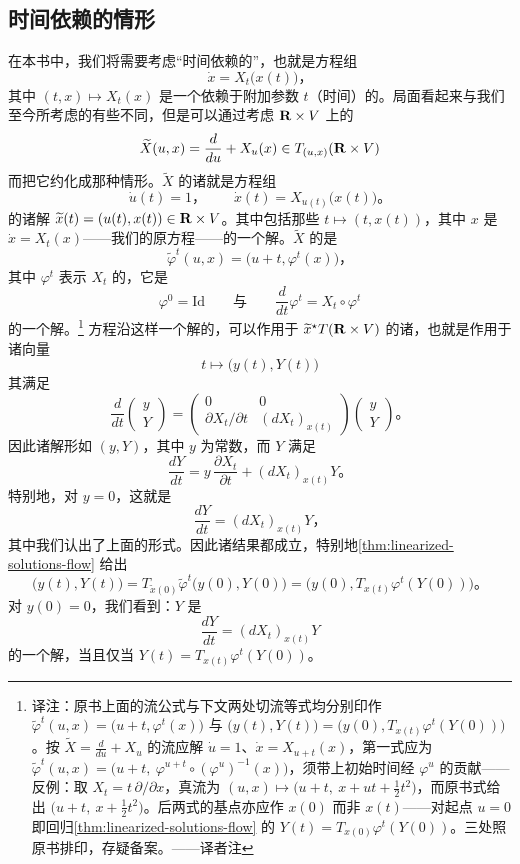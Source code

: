 \subsection{时间依赖\trVectorField{}的情形}
\label{subsec:time-dependent-vector-field}

在本书中，我们将需要考虑“时间依赖的”\trVectorField，也就是\trDifferential{}方程组
\[
\dot{x}=X_{t}\bigl(x(t)\bigr)\text{，}
\]
其中 $(t,x)\mapsto X_{t}(x)$ 是一个依赖于附加参数 $t$（时间）的\trVectorField。局面看起来与我们至今所考虑的有些不同，但是可以通过考虑 $\mathbf{R}\times V$ 上的\trVectorField
\[
\widetilde{X}(u,x)=\frac{d}{du}+X_{u}(x)\in T_{(u,x)}(\mathbf{R}\times V)
\]
而把它约化成那种情形。$\widetilde{X}$ 的诸\trTrajectory{}就是方程组
\[
\dot{u}(t)=1\text{，}\qquad\dot{x}(t)=X_{u(t)}\bigl(x(t)\bigr)\text{。}
\]
的诸解 $\widetilde{x}(t)=(u(t),x(t))\in\mathbf{R}\times V$。其中包括那些 $t\mapsto(t,x(t))$，其中 $x$ 是 $\dot{x}=X_{t}(x)$——我们的原方程——的一个解。$\widetilde{X}$ 的\trFlow{}是
\[
\widetilde{\varphi}^{t}(u,x)=\bigl(u+t,\varphi^{t}(x)\bigr)\text{，}
\]
其中 $\varphi^{t}$ 表示 $X_{t}$ 的\trFlow，它是
\[
\varphi^{0}=\mathrm{Id}\qquad\text{与}\qquad\frac{d}{dt}\varphi^{t}=X_{t}\circ\varphi^{t}
\]
的一个解。\footnote{译注：原书上面的流公式与下文两处切流等式均分别印作 $\widetilde{\varphi}^{t}(u,x)=\bigl(u+t,\varphi^{t}(x)\bigr)$ 与 $\bigl(y(t),Y(t)\bigr)=\bigl(y(0),T_{x(t)}\varphi^{t}(Y(0))\bigr)$。按 $\widetilde{X}=\frac{d}{du}+X_{u}$ 的流应解 $\dot{u}=1$、$\dot{x}=X_{u+t}(x)$，第一式应为 $\widetilde{\varphi}^{t}(u,x)=\bigl(u+t,\ \varphi^{u+t}\circ(\varphi^{u})^{-1}(x)\bigr)$，须带上初始时间经 $\varphi^{u}$ 的贡献——反例：取 $X_{t}=t\,\partial/\partial x$，真流为 $(u,x)\mapsto\bigl(u+t,\ x+ut+\tfrac{1}{2}t^{2}\bigr)$，而原书式给出 $\bigl(u+t,\ x+\tfrac{1}{2}t^{2}\bigr)$。后两式的基点亦应作 $x(0)$ 而非 $x(t)$——对起点 $u=0$ 即回归\cref{thm:linearized-solutions-flow} 的 $Y(t)=T_{x(0)}\varphi^{t}(Y(0))$。三处照原书排印，存疑备案。——译者注}
\trDifferential{}方程沿这样一个解的\trLinearization，可以作用于 $\widetilde{x}^{\star}T(\mathbf{R}\times V)$ 的诸\trSection{}，也就是作用于诸向量
\[
t\longmapsto\bigl(y(t),Y(t)\bigr)\]
其满足
\[
\frac{d}{dt}\begin{pmatrix}y\\ Y\end{pmatrix}=\begin{pmatrix}0&0\\ \partial X_{t}/\partial t&(dX_{t})_{x(t)}\end{pmatrix}\begin{pmatrix}y\\ Y\end{pmatrix}\text{。}
\]
因此诸解形如 $(y,Y)$，其中 $y$ 为常数，而 $Y$ 满足
\[
\frac{dY}{dt}=y\,\frac{\partial X_{t}}{\partial t}+(dX_{t})_{x(t)}Y\text{。}
\]
特别地，对 $y=0$，这就是
\[
\frac{dY}{dt}=(dX_{t})_{x(t)}Y\text{，}
\]
其中我们认出了上面的形式。因此诸结果都成立，特别地\cref{thm:linearized-solutions-flow} 给出
\[
\bigl(y(t),Y(t)\bigr)=T_{\widetilde{x}(0)}\widetilde{\varphi}^{t}\bigl(y(0),Y(0)\bigr)=\bigl(y(0),T_{x(t)}\varphi^{t}(Y(0))\bigr)\text{。}
\]
对 $y(0)=0$，我们看到：$Y$ 是
\[
\frac{dY}{dt}=(dX_{t})_{x(t)}Y
\]
的一个解，当且仅当 $Y(t)=T_{x(t)}\varphi^{t}(Y(0))$。
